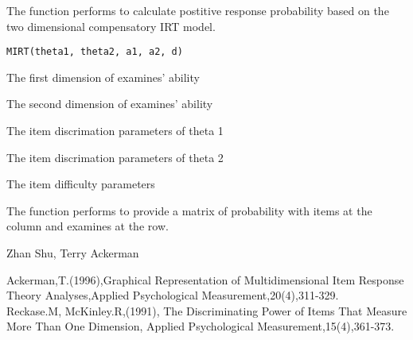 \begin{Description}\relax
The function performs to calculate postitive response probability based on the two dimensional compensatory IRT model.
\end{Description}
\begin{Usage}
\begin{verbatim}
MIRT(theta1, theta2, a1, a2, d)
\end{verbatim}
\end{Usage}
\begin{Arguments}
\begin{ldescription}
\item[\code{theta1}] The first dimension of examines' ability 
\item[\code{theta2}] The second dimension of examines' ability 
\item[\code{a1}] The item discrimation parameters of theta 1 
\item[\code{a2}] The item discrimation parameters of theta 2 
\item[\code{d}] The item difficulty parameters 
\end{ldescription}
\end{Arguments}
\begin{Value}
The function performs to provide a matrix of probability with items at the column and examines at the row.
\end{Value}
\begin{Author}\relax
Zhan Shu, Terry Ackerman
\end{Author}
\begin{References}\relax
Ackerman,T.(1996),Graphical Representation of Multidimensional Item Response Theory Analyses,Applied Psychological Measurement,20(4),311-329.\\
Reckase.M, McKinley.R,(1991), The Discriminating Power of Items That Measure More Than One Dimension, Applied Psychological Measurement,15(4),361-373.
\end{References}

